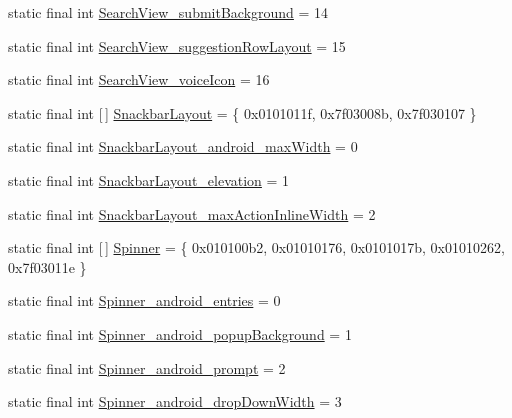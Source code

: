 \begin{DoxyCompactItemize}
\item 
static final int \mbox{\hyperlink{classandroid_1_1support_1_1design_1_1R_1_1styleable_a9d993a18b88d403afc9c07acad19a1b1}{Search\+View\+\_\+submit\+Background}} = 14
\item 
static final int \mbox{\hyperlink{classandroid_1_1support_1_1design_1_1R_1_1styleable_a3deb2c90b3e5b8644299a3f99b8600b8}{Search\+View\+\_\+suggestion\+Row\+Layout}} = 15
\item 
static final int \mbox{\hyperlink{classandroid_1_1support_1_1design_1_1R_1_1styleable_ad3cd224bd53a0d7aeb792c6cc96d9c48}{Search\+View\+\_\+voice\+Icon}} = 16
\item 
static final int \mbox{[}$\,$\mbox{]} \mbox{\hyperlink{classandroid_1_1support_1_1design_1_1R_1_1styleable_ade77d86fa8e689770b5436467abdc2db}{Snackbar\+Layout}} = \{ 0x0101011f, 0x7f03008b, 0x7f030107 \}
\item 
static final int \mbox{\hyperlink{classandroid_1_1support_1_1design_1_1R_1_1styleable_ae7cafc8b9ec5f6ae9e5d5465354a0764}{Snackbar\+Layout\+\_\+android\+\_\+max\+Width}} = 0
\item 
static final int \mbox{\hyperlink{classandroid_1_1support_1_1design_1_1R_1_1styleable_a54f3338cb1db3190d4f8d5f3a2475ddd}{Snackbar\+Layout\+\_\+elevation}} = 1
\item 
static final int \mbox{\hyperlink{classandroid_1_1support_1_1design_1_1R_1_1styleable_a0c233bcf31327c9409249283a7e660fa}{Snackbar\+Layout\+\_\+max\+Action\+Inline\+Width}} = 2
\item 
static final int \mbox{[}$\,$\mbox{]} \mbox{\hyperlink{classandroid_1_1support_1_1design_1_1R_1_1styleable_ac36e55e5a1c717e866dcadd92552fa64}{Spinner}} = \{ 0x010100b2, 0x01010176, 0x0101017b, 0x01010262, 0x7f03011e \}
\item 
static final int \mbox{\hyperlink{classandroid_1_1support_1_1design_1_1R_1_1styleable_aff0dfa8ecdb7641842809aebe5e65d73}{Spinner\+\_\+android\+\_\+entries}} = 0
\item 
static final int \mbox{\hyperlink{classandroid_1_1support_1_1design_1_1R_1_1styleable_ad937f167c55cbb577ed47c893518d69b}{Spinner\+\_\+android\+\_\+popup\+Background}} = 1
\item 
static final int \mbox{\hyperlink{classandroid_1_1support_1_1design_1_1R_1_1styleable_a6465e68ffbefc95670289286dfc4502c}{Spinner\+\_\+android\+\_\+prompt}} = 2
\item 
static final int \mbox{\hyperlink{classandroid_1_1support_1_1design_1_1R_1_1styleable_ab7674adcb14e8faef5f8b8ba404f68f0}{Spinner\+\_\+android\+\_\+drop\+Down\+Width}} = 3

\end{DoxyCompactItemize}
